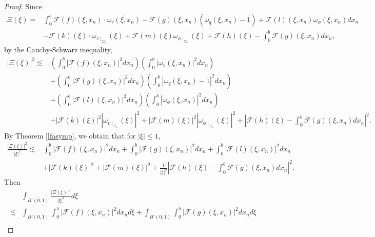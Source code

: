 \documentclass[10pt,a4paper]{amsart}
\newcommand{\abs}[1]{\left\lvert#1\right\rvert}
\begin{document}
\begin{proof}
    Since
    \begin{align}
        \Xi(\xi)=&\int_{0}^{b}\mathcal{F}(f)(\xi,x_{n})\cdot \overline{\omega_{v}(\xi,x_{n})}-\mathcal{F}(g)(\xi,x_{n})(\overline{\omega_{q}(\xi,x_{n})}-1)+\mathcal{F}(l)(\xi,x_{n})\overline{\omega_{\phi}(\xi,x_{n})}dx_{n} \nonumber\\
        &-\mathcal{F}(k)(\xi)\cdot\overline{\omega_{v\mid_{\Sigma_{b}}}(\xi)}+\mathcal{F}(m)(\xi)\overline{\omega_{\phi\mid_{\Sigma_{b}}}(\xi)}+\mathcal{F}(h)(\xi)-\int_{0}^{b}\mathcal{F}(g)(\xi,x_{n})dx_{n},
    \end{align}
    by the Cauchy-Schwarz inequality,
    \begin{align}
        \abs{\Xi(\xi)}^{2} \lesssim&\left(\int_{0}^{b}\abs{\mathcal{F}(f)(\xi,x_{n})}^{2}dx_{n}\right)\left(\int_{0}^{b}\abs{\omega_{v}(\xi,x_{n})}^{2}dx_{n}\right) \nonumber\\
        &+\left(\int_{0}^{b}\abs{\mathcal{F}(g)(\xi,x_{n})}^{2}dx_{n}\right)\left(\int_{0}^{b}\abs{\omega_{q}(\xi,x_{n})-1}^{2}dx_{n}\right) \nonumber\\
        &+\left(\int_{0}^{b}\abs{\mathcal{F}(l)(\xi,x_{n})}^{2}dx_{n}\right)\left(\int_{0}^{b}\abs{\omega_{\phi}(\xi,x_{n})}^{2}dx_{n}\right) \nonumber\\
        &+\abs{\mathcal{F}(k)(\xi)}^{2}\abs{\omega_{v\mid_{\Sigma_{b}}}(\xi)}^{2} +\abs{\mathcal{F}(m)(\xi)}^{2}\abs{\omega_{\phi\mid_{\Sigma_{b}}}(\xi)}^{2}+\abs{\mathcal{F}(h)(\xi)-\int_{0}^{b}\mathcal{F}(g)(\xi,x_{n})dx_{n}}^{2}.
    \end{align}
    By Theorem \ref{lfasymp}, we obtain that for \(\abs{\xi} \leq 1\),
    \begin{align}
        \frac{\abs{\Xi(\xi)}^{2}}{\abs{\xi}^{2}} \lesssim &\int_{0}^{b}\abs{\mathcal{F}(f)(\xi,x_{n})}^{2}dx_{n}+\int_{0}^{b}\abs{\mathcal{F}(g)(\xi,x_{n})}^{2}dx_{n}+\int_{0}^{b}\abs{\mathcal{F}(l)(\xi,x_{n})}^{2}dx_{n} \nonumber \\
        &+\abs{\mathcal{F}(k)(\xi)}^{2}+\abs{\mathcal{F}(m)(\xi)}^{2}+\frac{1}{\abs{\xi}^{2}}\abs{\mathcal{F}(h)(\xi)-\int_{0}^{b}\mathcal{F}(g)(\xi,x_{n})dx_{n}}^{2}.
    \end{align}
    Then
    \begin{align}
        &\int_{B'(0,1)}\frac{\abs{\Xi(\xi)}^{2}}{\abs{\xi}^{2}}d\xi \nonumber\\
        \lesssim &\int_{B'(0,1)}\int_{0}^{b}\abs{\mathcal{F}(f)(\xi,x_{n})}^{2}dx_{n}d\xi+\int_{B'(0,1)}\int_{0}^{b}\abs{\mathcal{F}(g)(\xi,x_{n})}^{2}dx_{n}d\xi \nonumber\\

\end{align}
\end{proof}
\end{document}
